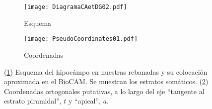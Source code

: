 \documentclass{article}
\begin{document}
\begin{figure}[h]
\centering
\begin{subfigure}[b]{0.45\textwidth}
\texttt{[image: DiagramaCAetDG02.pdf]}
\caption{Esquema}
\label{diagCA}
\end{subfigure}
\quad
\begin{subfigure}[b]{0.45\textwidth}
\texttt{[image: PseudoCoordinates01.pdf]}
\caption{Coordenadas}
\label{pseudocor}
\end{subfigure}
\caption{ (\ref{diagCA}) Esquema del hipocámpo en nuestras rebanadas y su
colocación aproximada en el BioCAM. Se muestran los estratos somáticos.
(\ref{pseudocor}) Coordenadas ortogonales putativas, a lo largo del eje
``tangente al estrato piramidal'', $t$ y ``apical'', $a$. } 
\label{esquemas01}
\end{figure}
\end{document}
